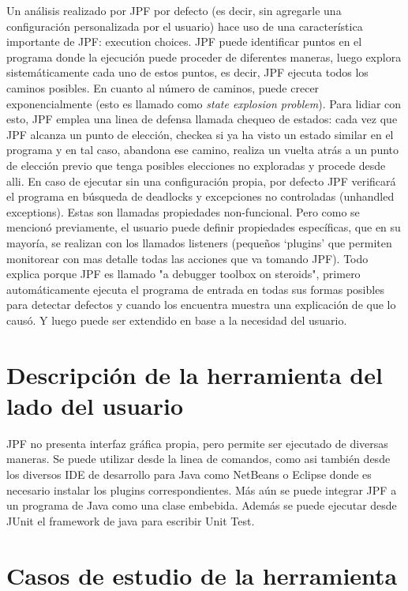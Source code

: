 \documentclass[runningheads]{llncs}
\begin{document}
Un an\'alisis realizado por JPF por defecto (es decir, sin agregarle una configuraci\'on personalizada por el usuario) hace uso de una caracter\'istica importante de JPF: execution choices. JPF puede identificar puntos en el programa donde la ejecuci\'on puede proceder de diferentes maneras, luego explora sistem\'aticamente cada uno de estos puntos, es decir, JPF ejecuta todos los caminos posibles. En cuanto al n\'umero de caminos, puede crecer exponencialmente (esto es llamado como \textit{state explosion problem}). Para lidiar con esto, JPF emplea una linea de defensa llamada chequeo de estados: cada vez que JPF alcanza un punto de elecci\'on, checkea si ya ha visto un estado similar en el programa y en tal caso, abandona ese camino, realiza un vuelta atr\'as a un punto de elecci\'on previo que tenga posibles elecciones no exploradas y procede desde alli. 
En caso de ejecutar sin una configuraci\'on propia, por defecto JPF verificar\'a el programa en b\'usqueda de deadlocks y excepciones no controladas (unhandled exceptions). Estas son llamadas propiedades non-funcional. Pero como se mencion\'o previamente, el usuario puede definir propiedades espec\'ificas, que en su mayor\'ia, se realizan con los llamados listeners (peque\~nos ‘plugins’ que permiten monitorear con mas detalle todas las acciones que va tomando JPF). Todo explica porque JPF es llamado "a debugger toolbox on steroids", primero autom\'aticamente ejecuta el programa de entrada en todas sus formas posibles para detectar defectos y cuando los encuentra muestra una explicaci\'on de que lo caus\'o. Y luego puede ser extendido en base a la necesidad del usuario.


\section{Descripci\'on de la herramienta del lado del usuario}

JPF no presenta interfaz gr\'afica propia, pero permite ser ejecutado de diversas maneras. Se puede utilizar desde la linea de comandos, como asi tambi\'en desde los diversos IDE de desarrollo para Java como NetBeans o Eclipse donde es necesario instalar los plugins correspondientes. M\'as a\'un se puede integrar JPF a un programa de Java como una clase embebida.
Adem\'as se puede ejecutar desde JUnit el framework de java para escribir Unit Test.


\section{Casos de estudio de la herramienta}
\end{document}
